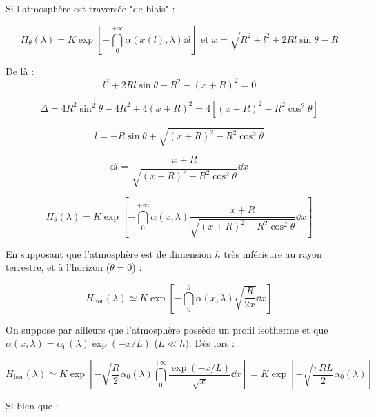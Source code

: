 \documentclass[11pt]{article} %
\begin{document}
Si l'atmosphère est traversée "de biais" : 

\begin{equation}
H_\theta(\lambda) = K \exp \left [ -\dint_0^{+\infty} \alpha(x(l), \lambda) \dd l\right ] \mbox{ et } x = \sqrt{R^2 + l^2 + 2 R l \sin \theta} - R
\end{equation}

De là : 
\begin{equation}
l^2 + 2 R l \sin \theta + R^2 - (x+R)^2 = 0
\end{equation}

\begin{equation}
\Delta = 4 R^2 \sin^2 \theta - 4 R^2 + 4 (x+R)^2 = 4 \left [ (x+R)^2 -  R^2\cos^2 \theta \right ]
\end{equation}

\begin{equation}
l = - R \sin \theta + \sqrt{(x+R)^2 -  R^2\cos^2 \theta }
\end{equation}

\begin{equation}
\dd l =  \dfrac{x + R}{\sqrt{(x+R)^2 -  R^2\cos^2 \theta }} \dd x
\end{equation}

\begin{equation}
H_\theta(\lambda) = K \exp \left [ -\dint_0^{+\infty} \alpha(x, \lambda) \dfrac{x + R}{\sqrt{(x+R)^2 -  R^2\cos^2 \theta }} \dd x\right ] 
\end{equation}

En supposant que l'atmosphère est de dimension $h$ très inférieure au rayon terrestre, et à l'horizon ($\theta = 0$) :

\begin{equation}
H_{\mbox{hor}}(\lambda) \simeq K \exp \left [ -\dint_0^{h} \alpha(x, \lambda) \sqrt{\dfrac{R}{2x}} \dd x\right ] 
\end{equation}

On suppose par ailleurs que l'atmosphère possède un profil isotherme et que $\alpha(x, \lambda) = \alpha_0(\lambda) \exp(-x/L)$ ($L \ll h)$. Dès lors :

\begin{equation}
H_{\mbox{hor}}(\lambda) \simeq K \exp \left [ - \sqrt{\dfrac{R}{2}} \alpha_0 (\lambda) \dint_0^{+\infty} \dfrac{\exp(-x/L)}{\sqrt{x}} \dd x\right ] = K \exp \left [ - \sqrt{\dfrac{\pi R L}{2}} \alpha_0 (\lambda)\right ]
\end{equation}

Si bien que :
\end{document}
